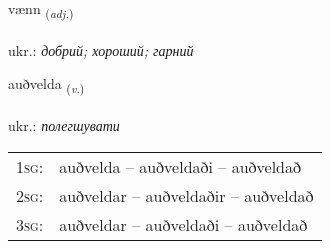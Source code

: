 \documentclass[frontgrid, backgrid]{flacards}\usepackage[]{graphicx}\usepackage[]{xcolor}
\begin{document}
\renewcommand{\flhead}{\vskip5pt \fboxsep=0pt {\small\bfseries\footnotesize Lýsingarorð | прикметник}}
\renewcommand{\fcfoot}{\vskip5pt \fboxsep=0pt \hspace{2pt}{\small\bfseries\footnotesize 2K}}

\renewcommand{\blhead}{\vskip5pt {\small\bfseries\footnotesize Lýsingarorð | прикметник }}
\renewcommand{\bcfoot}{\vskip5pt \hspace{2pt}{\small\bfseries\footnotesize 2K}}


{vænn \small{\textsubscript{(\textit{adj.})}} \\[1ex] %
\textphonetic{[vaitn̥]} \\
ukr.: \emph{добрий; хороший; гарний} \\  [2ex]
\renewcommand*{\arraystretch}{0.8}
}

\renewcommand{\flhead}{\vskip5pt \fboxsep=0pt {\small\bfseries\footnotesize Sagnorð | дієслово}}
\renewcommand{\fcfoot}{\vskip5pt \fboxsep=0pt \hspace{2pt}{\small\bfseries\footnotesize 2K}}

\renewcommand{\blhead}{\vskip5pt {\small\bfseries\footnotesize Sagnorð | дієслово }}
\renewcommand{\bcfoot}{\vskip5pt \hspace{2pt}{\small\bfseries\footnotesize 2K}}


{auðvelda \small{\textsubscript{(\textit{v.})}} \\[1ex] %
\textphonetic{[œiðvɛlta]} \\
ukr.: \emph{полегшувати} \\  [2ex]
\renewcommand*{\arraystretch}{0.8}
\begin{tabular}{p{1cm}l}
\textsc{1sg}: & auðvelda -- auðveldaði -- auðveldað \\ 
\textsc{2sg}: & auðveldar -- auðveldaðir -- auðveldað \\ 
\textsc{3sg}: & auðveldar -- auðveldaði -- auðveldað \\ 
\end{tabular}
}
\end{document}
